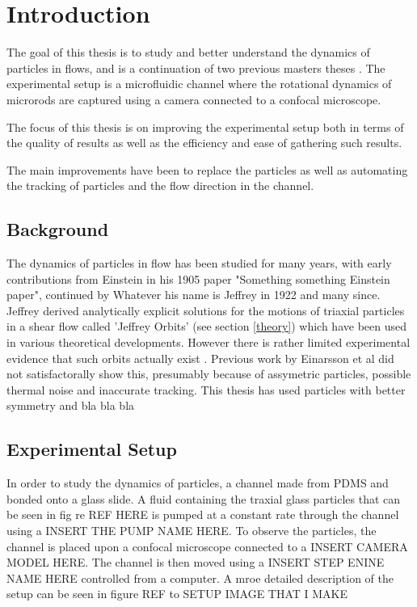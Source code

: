 \documentclass[]{report}
\title{}
\author{}
\begin{document}
\maketitle

\begin{abstract}

\end{abstract}

\chapter{Introduction}
The goal of this thesis is to study and better understand the dynamics of particles in flows, and is a continuation of two previous masters theses \cite{AntonExjobb}\cite{JonasExjobb}. The experimental setup is a microfluidic channel where the rotational dynamics of microrods are captured using a camera connected to a confocal microscope. 

The focus of this thesis is on improving the experimental setup both in terms of the quality of results as well as the efficiency and ease of gathering such results.

The main improvements have been to replace the particles as well as automating the tracking of particles and the flow direction in the channel.

\section{Background}
The dynamics of particles in flow has been studied for many years, with early contributions from Einstein in his 1905 paper "Something something Einstein paper"\cite{EinsteinsPaper}, continued by Whatever his name is Jeffrey in 1922 and many since. Jeffrey derived analytically explicit solutions for the motions of triaxial particles in a shear flow called 'Jeffrey Orbits' (see section \ref{theory}) which have been used in various theoretical developments. However there is rather limited experimental evidence that such orbits actually exist \cite{IReallyWantACiteHere}. Previous work by Einarsson\cite{EinarssonsPaper} et al did not satisfactorally show this, presumably because of assymetric particles, possible thermal noise and inaccurate tracking. This thesis has used particles with better symmetry and bla bla bla


\section{Experimental Setup}
In order to study the dynamics of particles, a channel made from PDMS and bonded onto a glass slide. A fluid containing the traxial glass particles that can be seen in fig re REF HERE is pumped at a constant rate through the channel using a INSERT THE PUMP NAME HERE. To observe the particles, the channel is placed upon a confocal microscope connected to a INSERT CAMERA MODEL HERE. The channel is then moved using a INSERT STEP ENINE NAME HERE controlled from a computer. A mroe detailed description of the setup can be seen in figure REF to SETUP IMAGE THAT I MAKE
\end{document}
